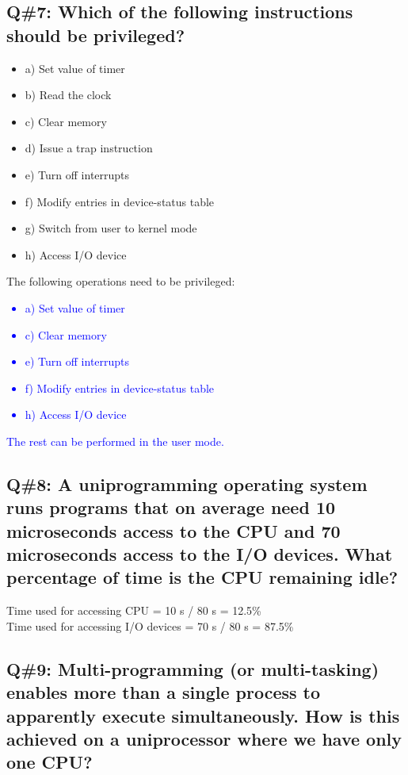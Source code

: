 \subsection*{Q\#7: Which of the following instructions should be privileged?}
\begin{itemize}
  \item a) Set value of timer
  \item b) Read the clock
  \item c) Clear memory
  \item d) Issue a trap instruction
  \item e) Turn off interrupts
  \item f) Modify entries in device-status table
  \item g) Switch from user to kernel mode
  \item h) Access I/O device
\end{itemize}
The following operations need to be privileged:
\textcolor{blue}{
\begin{itemize}
  \item a) Set value of timer
  \item c) Clear memory
  \item e) Turn off interrupts
  \item f) Modify entries in device-status table
  \item h) Access I/O device
\end{itemize}
The rest can be performed in the user mode.
}

\subsection*{Q\#8: A uniprogramming operating system runs programs that on average need 10 microseconds access to the CPU and 70 microseconds access to the I/O devices. What percentage of time is the CPU remaining idle?}

Time used for accessing CPU = 10 \textmu s / 80 \textmu s = 12.5\%  \\
Time used for accessing I/O devices = 70 \textmu s / 80 \textmu s = 87.5\%

\subsection*{Q\#9: Multi-programming (or multi-tasking) enables more than a single process to apparently execute simultaneously. How is this achieved on a uniprocessor where we have only one CPU?}

